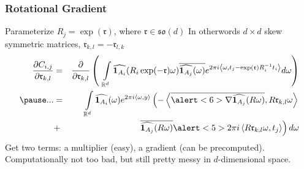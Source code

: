 \documentclass{beamer}
\begin{document}
\begin{frame}
\frametitle{Rotational Gradient}
\newcommand{\rr}{\mathfrak{r}}
Parameterize $R_j = \exp( \mathfrak{r} )$, where $\rr \in \mathfrak{so}(d)$ \vskip2pt
\hskip5pt{\small In otherwords $d \times d$ skew symmetric matrices, $\rr_{k,l} = -\rr_{l,k}$}
\pause
\begin{eqnarray*}
\frac{\partial C_{i,j}}{\partial \rr_{k,l}}  
& = &
 \frac{ \partial }{ \partial \rr_{k,l} } \left( \:\: 
	\int \limits_{\R^d} 
		\widehat{\ind{A_i}}(R_i \exp(-\rr) \omega) 
		\overline{\widehat{\ind{A_j}}(\omega)} 
		e^{2 \pi i \inner{\omega}{t_j - \exp(\rr) R_i^{-1} t_i}} 
	d \omega  
\right )\\
\pause
...
& = &
	\int \limits_{\R^d} 
		\widehat{\ind{A_i}}(\omega) e^{2 \pi i \inner{\omega}{y}} 
		\left(
			-\inner{\overline{\alert<6>{\nabla \widehat{\ind{A_j}}(R \omega)}}  }{  R \rr_{k,l} \omega } 
		\right. \\
& + & 	\left. 
			\overline{\widehat{\ind{A_j}}(R \omega)} 
			\alert<5>{2 \pi i \inner{R \rr_{k,l} \omega}{  t_j} }
		\right)
	d \omega
\end{eqnarray*}
\pause
Get two terms: \pause \alert<5>{a multiplier (easy)}, \pause \alert<6>{a gradient (can be precomputed)}.
\pause
\vskip10pt
Computationally not too bad, but still pretty messy in $d$-dimensional space.
\end{frame}

\end{document}
